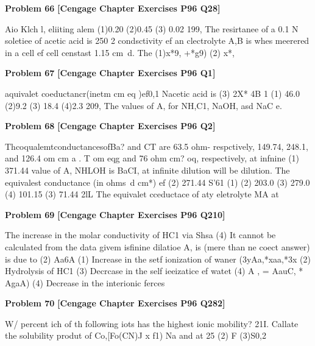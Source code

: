 \begin{problembox}
\textbf{Problem 66} \hfill \textbf{[Cengage Chapter Exercises P96 Q28]}
\label{q:ext-cng-th-66}

Aio Klch l, eliiting alem
(1)0.20
(2)0.45
(3) 0.02
199, The resirtanee of a 0.1 N soletiee of acetic acid is 250 2
condsctivity ef an clectrolyte A,B is
whes meerered in a cell ef cell censtast 1.15 cm~d. The
(1)x*9, +*g9)
(2) x*,
\end{problembox}

\begin{problembox}
\textbf{Problem 67} \hfill \textbf{[Cengage Chapter Exercises P96 Q1]}
\label{q:ext-cng-th-67}

aquivalet coeductancr(inetm cm eq )ef0,1 Nacetic
acid is
(3) 2X*
4B 1
(1) 46.0
(2)9.2
(3) 18.4
(4)2.3
209, The values of A, for NH,C1, NaOH, asd NaC e.
\end{problembox}

\begin{problembox}
\textbf{Problem 68} \hfill \textbf{[Cengage Chapter Exercises P96 Q2]}
\label{q:ext-cng-th-68}

ThcoqualemtconductancesofBa? and CT  are 63.5 ohm-
respctively, 149.74, 248.1, and 126.4 om cm a . T
om  eqg and 76 ohm cm? oq, respectively, at infnine
(1) 371.44
value of A, NHLOH is
BaCI, at infinite dilution will be
dilution. The equivalest conductance (in ohms~d cm*) ef
(2) 271.44
S'61 (1)
(2) 203.0
(3) 279.0
(4) 101.15
(3) 71.44
2lL The equivalet cceductace of aty eletrolyte MA at
\end{problembox}

\begin{problembox}
\textbf{Problem 69} \hfill \textbf{[Cengage Chapter Exercises P96 Q210]}
\label{q:ext-cng-th-69}

The increase in the molar conductivity of HC1 via Shsa
(4) It cannot be calculated from the data givem
isfinine dilatioe A, is (mere than ne coect answer)
is due to
(2) Aa6A
(1) Increase in the setf ionization of waner
(3yAa,*xaa,*3x
(2) Hydrolysis of HC1
(3) Decrcase in the self ieeizatice ef watet
(4) A , = AauC, * AgaA)
(4) Decrease in the interionic ferces
\end{problembox}

\begin{problembox}
\textbf{Problem 70} \hfill \textbf{[Cengage Chapter Exercises P96 Q282]}
\label{q:ext-cng-th-70}

W/ percent ich of th following iots has the highest ionic mobility?
21I. Callate the solubility produt of Co,[Fo(CN)J  x
f1) Na and 
at 25 
(2) F
(3)S0,2
\end{problembox}

